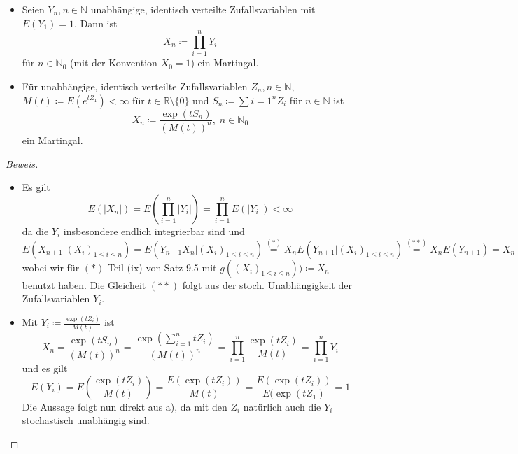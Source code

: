 \documentclass[10pt]{article}
\newenvironment{Aufgabe}[2][Aufgabe]{\begin{trivlist}
\item[\hskip \labelsep {\bfseries #1}\hskip \labelsep {\bfseries #2.}]}{\end{trivlist}}
\begin{document}
 
 \begin{Aufgabe}{2} %
 \begin{itemize}
 \item[a)]
	Seien $Y_n, n \in \mathbb{N}$ unabhängige, identisch verteilte Zufallsvariablen mit $E(Y_1)=1$. Dann ist 
	$$
	X_n \coloneqq \prod_{i=1}^n Y_i
	$$ 
	für $n \in \mathbb{N}_0$ (mit der Konvention $X_0 = 1$) ein Martingal.
 \item[b)]
	Für unabhängige, identisch verteilte Zufallsvariablen $Z_n, n \in \mathbb{N}$, $M(t) \coloneqq E(e^{tZ_1}) < \infty$ für $t \in \mathbb{R} \setminus \{0\}$ und $S_n \coloneqq \sum{i=1}^n Z_i$ für $n \in \mathbb{N}$ ist
	$$
	X_n \coloneqq \frac{\exp(tS_n)}{(M(t))^n}, \; n \in \mathbb{N}_0
	$$
	ein Martingal.
\end{itemize}
\end{Aufgabe}

\begin{proof}[Beweis]  
 \begin{itemize}
 \item[a)]
	Es gilt 
	$$
	E(|X_n|) = E(\prod_{i=1}^n |Y_i|) = \prod_{i=1}^n E(|Y_i|) < \infty 
	$$
	da die $Y_i$ insbesondere endlich integrierbar sind und
	$$
	E(X_{n+1}|(X_i)_{1 \leq i \leq n}) = E(Y_{n+1}X_{n}|(X_i)_{1 \leq i \leq n}) \overset{(*)}{=} X_n E(Y_{n+1} | (X_i)_{1 \leq i \leq n}) \overset{(**)}{=}  X_n E(Y_{n+1}) = X_n 
	$$
	wobei wir für $(*)$ Teil (ix) von Satz 9.5 mit $g((X_i)_{1 \leq i \leq n})) \coloneqq X_n $ benutzt haben. Die Gleicheit $(**)$ folgt aus der stoch. Unabhängigkeit der Zufallsvariablen $Y_i$.
 \item[b)] Mit $Y_i \coloneqq \frac{\exp(tZ_i)}{M(t)}$ ist
 $$
 X_n = \frac{\exp(tS_n)}{(M(t))^n} = \frac{\exp(\sum_{i=1}^n tZ_i)}{(M(t))^n} = \prod_{i=1}^n \frac{\exp(tZ_i)}{M(t)} = \prod_{i=1}^n Y_i
 $$
 und es gilt
 $$
 E(Y_i) = E\left(\frac{\exp(tZ_i)}{M(t)}\right) = \frac{E(\exp(tZ_i))}{M(t)} = \frac{E(\exp(tZ_i))}{E(\exp(tZ_1)} = 1
 $$
 Die Aussage folgt nun direkt aus a), da mit den $Z_i$ natürlich auch die $Y_i$ stochastisch unabhängig sind.
 
\end{itemize}
\end{proof}
\end{document}
